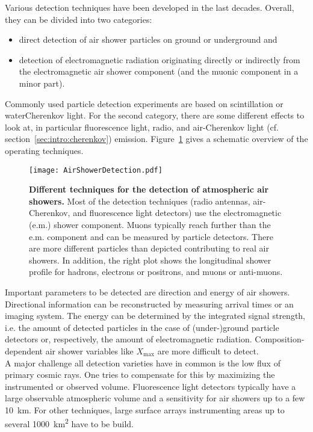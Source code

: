 Various detection techniques have been developed in the last decades. Overall, they can be divided into two categories:
\begin{itemize}
	\item direct detection of air shower particles on ground or underground and
	\item detection of electromagnetic radiation originating directly or indirectly from the electromagnetic air shower component (and the muonic component in a minor part).
\end{itemize}
Commonly used particle detection experiments are based on scintillation or water\-Cherenkov light.
For the second category, there are some different effects to look at, in particular fluorescence light, radio, and air-Cherenkov light (cf. section~\ref{sec:intro:cherenkov}) emission. Figure~\ref{intro:airshower_detection_sketch} gives a schematic overview of the operating techniques.~\cite{airshowers:schroeder}\\

\begin{figure}[h]
	\texttt{[image: AirShowerDetection.pdf]}
	\caption[Different techniques for air shower detection]{\textbf{Different techniques for the detection of atmospheric air showers.} \cite{airshowers:schroeder} Most of the detection techniques (radio antennas, air-Cherenkov, and fluorescence light detectors) use the electromagnetic (e.m.) shower component. Muons typically reach further than the e.m. component and can be measured by particle detectors. There are more different particles than depicted contributing to real air showers. In addition, the right plot shows the longitudinal shower profile for hadrons, electrons or positrons, and muons or anti-muons.}	
	\label{intro:airshower_detection_sketch}
\end{figure}

Important parameters to be detected are direction and energy of air showers. Directional information can be reconstructed by measuring arrival times or an imaging system. The energy can be determined by the integrated signal strength, i.e. the amount of detected particles in the case of (under-)ground particle detectors or, respectively, the amount of electromagnetic radiation. Composition-dependent air shower variables like $X_\text{max}$ are more difficult to detect.\\

A major challenge all detection varieties have in common is the low flux of primary cosmic rays. One tries to compensate for this by maximizing the instrumented or observed volume. Fluorescence light detectors typically have a large observable atmospheric volume and a sensitivity for air showers up to a few \SI{10}{\kilo\meter}. For other techniques, large surface arrays instrumenting areas up to several \SI{1000}{\kilo\meter\squared} have to be build.~\cite{airshowers:schroeder}\\

